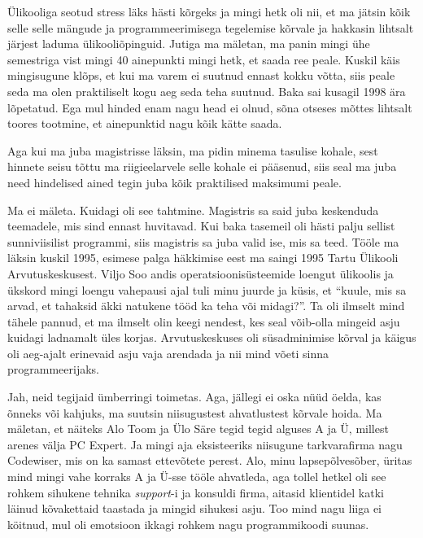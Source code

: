 Ülikooliga seotud stress läks hästi kõrgeks ja mingi hetk oli nii, et ma jätsin kõik selle selle mängude ja  programmeerimisega tegelemise kõrvale ja hakkasin lihtsalt järjest laduma ülikooliõpinguid. Jutiga ma mäletan, ma panin mingi ühe semestriga vist mingi 40 ainepunkti mingi hetk, et saada ree peale. Kuskil käis mingisugune klõps, et kui ma varem ei suutnud ennast  kokku võtta, siis peale seda ma olen praktiliselt kogu aeg seda teha suutnud. Baka sai kusagil 1998 ära lõpetatud. Ega mul hinded enam nagu head ei olnud,  sõna otseses mõttes lihtsalt toores tootmine, et ainepunktid nagu kõik kätte saada. 

Aga kui ma juba magistrisse läksin, ma pidin minema tasulise kohale, sest hinnete seisu tõttu ma riigieelarvele selle kohale ei pääsenud, siis seal ma juba need hindelised ained tegin juba kõik praktilised maksimumi peale. 


Ma ei mäleta. Kuidagi oli see tahtmine. Magistris sa said juba keskenduda teemadele, mis sind ennast huvitavad. Kui baka tasemeil oli hästi palju sellist sunniviisilist programmi, siis magistris sa juba valid ise, mis sa teed. Tööle ma läksin kuskil 1995, esimese palga häkkimise eest ma saingi 1995 Tartu Ülikooli Arvutuskeskusest. Viljo Soo andis operatsioonisüsteemide loengut ülikoolis ja ükskord mingi loengu vahepausi ajal tuli minu juurde ja küsis, et \enquote{kuule, mis sa arvad, et tahaksid äkki natukene tööd ka teha või midagi?}. Ta oli ilmselt mind tähele pannud, et ma ilmselt olin keegi nendest, kes seal võib-olla mingeid asju  kuidagi ladnamalt üles korjas. Arvutuskeskuses oli süsadminimise kõrval ja  käigus oli aeg-ajalt erinevaid asju vaja arendada ja nii mind võeti sinna programmeerijaks. 


Jah, neid tegijaid ümberringi toimetas. Aga, jällegi ei oska nüüd öelda, kas õnneks või kahjuks, ma suutsin niisugustest ahvatlustest  kõrvale hoida. Ma mäletan, et näiteks Alo Toom ja Ülo Säre tegid tegid alguses A ja Ü, millest arenes välja PC Expert.  Ja mingi aja eksisteeriks niisugune tarkvarafirma nagu Codewiser, mis on ka samast  ettevõtete perest. Alo, minu  lapsepõlvesõber, üritas mind mingi vahe korraks A ja Ü-sse tööle ahvatleda, aga tollel hetkel  oli see rohkem sihukene tehnika \emph{support}-i ja konsuldi firma, aitasid klientidel katki läinud kõvakettaid taastada ja mingid sihukesi asju. Too mind nagu liiga ei köitnud, mul  oli emotsioon  ikkagi rohkem nagu programmikoodi suunas. 

